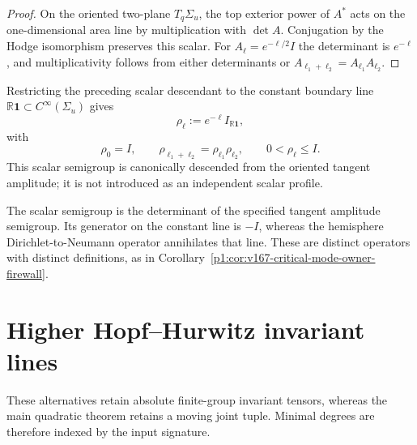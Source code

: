 \documentclass[11pt]{article}
\begin{document}
\begin{proof}
On the oriented two-plane $T_q\Sigma_u$, the top exterior power of $A^*$ acts
on the one-dimensional area line by multiplication with $\det A$.  Conjugation
by the Hodge isomorphism preserves this scalar.  For
$A_\ell=e^{-\ell/2}I$ the determinant is $e^{-\ell}$, and multiplicativity
follows from either determinants or $A_{\ell_1+\ell_2}=A_{\ell_1}A_{\ell_2}$.
\end{proof}

\begin{corollary}
\label{p1:cor:v557-boundary-scalar-semigroup}
Restricting the preceding scalar descendant to the constant boundary line
$\mathbb R\mathbf1\subset C^\infty(\Sigma_u)$ gives
\[
 \rho_\ell:=e^{-\ell}I_{\mathbb R\mathbf1},
\]
with
\[
 \rho_0=I,
 \qquad
 \rho_{\ell_1+\ell_2}=\rho_{\ell_1}\rho_{\ell_2},
 \qquad
 0<\rho_\ell\le I.
\]
This scalar semigroup is canonically descended from the oriented tangent
amplitude; it is not introduced as an independent scalar profile.
\end{corollary}

\begin{remark}
\label{p1:rem:v557-boundary-process-owner-firewall}
The scalar semigroup is the determinant of the specified tangent
amplitude semigroup.  Its generator on the constant line is \(-I\),
whereas the hemisphere Dirichlet-to-Neumann operator annihilates that line.
These are distinct operators with distinct definitions, as in
Corollary~\ref{p1:cor:v167-critical-mode-owner-firewall}.
\end{remark}

\section{Higher Hopf--Hurwitz invariant lines}
\label{p1:app:higher-hopf-hurwitz-invariant-lines}

These alternatives retain absolute finite-group invariant tensors, whereas
the main quadratic theorem retains a moving joint tuple.  Minimal degrees
are therefore indexed by the input signature.
\end{document}
